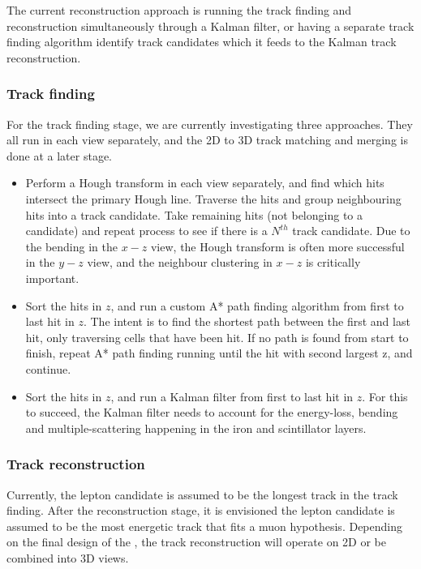 \documentclass[../main-v1.tex]{subfiles}
\begin{document}
The current  reconstruction approach is running the track finding and reconstruction simultaneously through a Kalman filter, or having a separate track finding algorithm identify track candidates which it feeds to the Kalman track reconstruction.

\subsubsection{Track finding}
For the track finding stage, we are currently investigating three approaches. They all run in each view separately, and the 2D to 3D track matching and merging is done at a later stage.

\begin{itemize}
    \item Perform a Hough transform \cite{Hough:1959qva} in each view separately, and find which hits intersect the primary Hough line. Traverse the hits and group neighbouring hits into a track candidate. Take remaining hits (not belonging to a candidate) and repeat process to see if there is a $N^{th}$ track candidate. Due to the bending in the $x-z$ view, the Hough transform is often more successful in the $y-z$ view, and the neighbour clustering in $x-z$ is critically important.

    \item Sort the hits in $z$, and run a custom A* path finding algorithm from first to last hit in $z$. The intent is to find the shortest path between the first and last hit, only traversing cells that have been hit. If no path is found from start to finish, repeat A* path finding running until the hit with second largest z, and continue.
    
    \item Sort the hits in $z$, and run a Kalman filter from first to last hit in $z$. For this to succeed, the Kalman filter needs to account for the energy-loss, bending and multiple-scattering happening in the iron and scintillator layers. 
\end{itemize}

\subsubsection{Track reconstruction}
Currently, the lepton candidate is assumed to be the longest track in the track finding. After the reconstruction stage, it is envisioned the lepton candidate is assumed to be the most energetic track that fits a muon hypothesis. Depending on the final design of the , the track reconstruction will operate on 2D or be combined into 3D views. 
\end{document}
